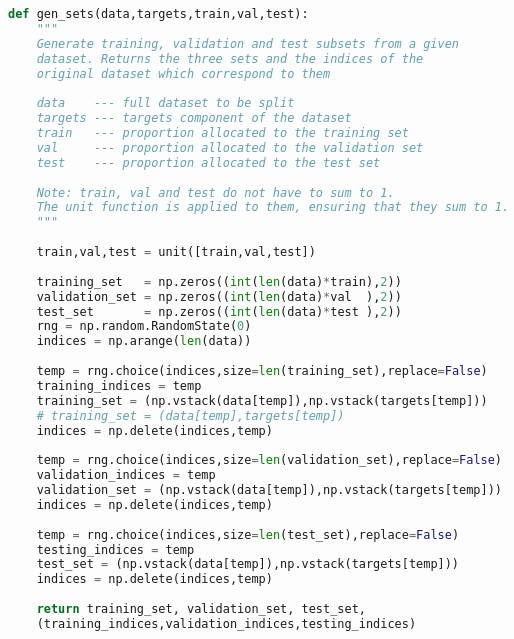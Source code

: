 \newpage
\begin{lstlisting}[language=Python, caption=Generating sets, captionpos=b, label={list:gen_sets}]
def gen_sets(data,targets,train,val,test):
	"""
	Generate training, validation and test subsets from a given 
	dataset. Returns the three sets and the indices of the 
	original dataset which correspond to them
	
	data    --- full dataset to be split
	targets --- targets component of the dataset
	train   --- proportion allocated to the training set
	val     --- proportion allocated to the validation set
	test    --- proportion allocated to the test set
	
	Note: train, val and test do not have to sum to 1. 
	The unit function is applied to them, ensuring that they sum to 1.
	"""
	
	train,val,test = unit([train,val,test])
	
	training_set   = np.zeros((int(len(data)*train),2))
	validation_set = np.zeros((int(len(data)*val  ),2))
	test_set       = np.zeros((int(len(data)*test ),2))
	rng = np.random.RandomState(0)
	indices = np.arange(len(data))
	
	temp = rng.choice(indices,size=len(training_set),replace=False)
	training_indices = temp
	training_set = (np.vstack(data[temp]),np.vstack(targets[temp]))
	# training_set = (data[temp],targets[temp])
	indices = np.delete(indices,temp)
	
	temp = rng.choice(indices,size=len(validation_set),replace=False)
	validation_indices = temp
	validation_set = (np.vstack(data[temp]),np.vstack(targets[temp]))
	indices = np.delete(indices,temp)
	
	temp = rng.choice(indices,size=len(test_set),replace=False)
	testing_indices = temp
	test_set = (np.vstack(data[temp]),np.vstack(targets[temp]))
	indices = np.delete(indices,temp)
	
	return training_set, validation_set, test_set, 
	(training_indices,validation_indices,testing_indices)
\end{lstlisting}

